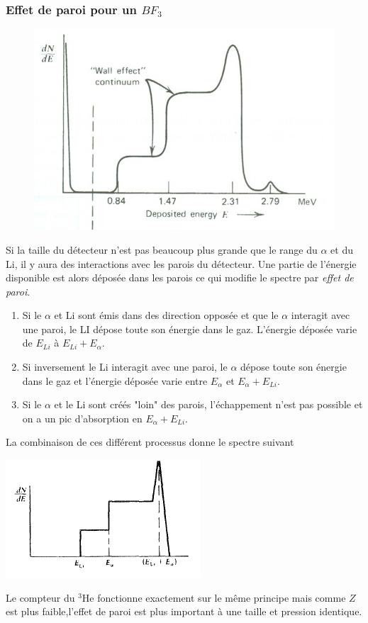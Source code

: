 \subsubsection{Effet de paroi pour un $BF_3$}
	\begin{figure}
	\vspace{-17mm}
	\includegraphics[scale=0.2]{ch11/image2}
	\end{figure}
Si la taille du détecteur n'est pas beaucoup plus grande que le range du $\alpha$ et du Li, il y
aura des interactions avec les parois du détecteur. Une partie de l'énergie disponible est alors
déposée dans les parois ce qui modifie le spectre par \textit{effet de paroi}.
\begin{enumerate}
\item Si le $\alpha$ et Li sont émis dans des direction opposée et que le $\alpha$ interagit avec
une paroi, le LI dépose toute son énergie dans le gaz. L'énergie déposée varie de $E_{Li}$ à 
$E_{Li}+E_\alpha$.
\item Si inversement le Li interagit avec une paroi, le $\alpha$ dépose toute son énergie dans le
gaz et l'énergie déposée varie entre $E_\alpha$ et $E_\alpha+E_{Li}$.
\item Si le $\alpha$ et le Li sont créés "loin" des parois, l'échappement n'est pas possible et 
on a un pic d'absorption en $E_\alpha+E_{Li}$.
\end{enumerate}
La combinaison de ces différent processus donne le spectre suivant
\begin{center}
	\includegraphics[scale=0.6]{ch11/image3}
\end{center}
Le compteur du $^3$He fonctionne exactement sur le même principe mais comme $Z$ est plus faible,l'effet de paroi est plus important à une taille et pression identique.
\newpage


